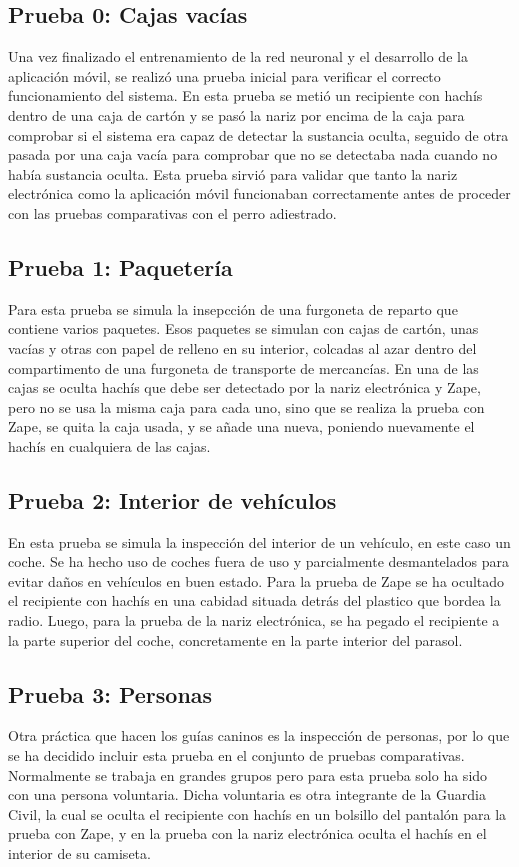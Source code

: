 \subsection{Prueba 0: Cajas vacías}
Una vez finalizado el entrenamiento de la red neuronal y el desarrollo de la aplicación móvil, se realizó una prueba inicial para verificar el correcto funcionamiento del sistema. En esta prueba se metió un recipiente con hachís dentro de una caja de cartón y se pasó la nariz por encima de la caja para comprobar si el sistema era capaz de detectar la sustancia oculta, seguido de otra pasada por una caja vacía para comprobar que no se detectaba nada cuando no había sustancia oculta. Esta prueba sirvió para validar que tanto la nariz electrónica como la aplicación móvil funcionaban correctamente antes de proceder con las pruebas comparativas con el perro adiestrado.

\subsection{Prueba 1: Paquetería}
Para esta prueba se simula la insepcción de una furgoneta de reparto que contiene varios paquetes. Esos paquetes se simulan con cajas de cartón, unas vacías y otras con papel de relleno en su interior, colcadas al azar dentro del compartimento de una furgoneta de transporte de mercancías. En una de las cajas se oculta hachís que debe ser detectado por la nariz electrónica y Zape, pero no se usa la misma caja para cada uno, sino que se realiza la prueba con Zape, se quita la caja usada, y se añade una nueva, poniendo nuevamente el hachís en cualquiera de las cajas.

\subsection{Prueba 2: Interior de vehículos}
En esta prueba se simula la inspección del interior de un vehículo, en este caso un coche. Se ha hecho uso de coches fuera de uso y parcialmente desmantelados para evitar daños en vehículos en buen estado. Para la prueba de Zape se ha ocultado el recipiente con hachís en una cabidad situada detrás del plastico que bordea la radio. Luego, para la prueba de la nariz electrónica, se ha pegado el recipiente a la parte superior del coche, concretamente en la parte interior del parasol.

\subsection{Prueba 3: Personas}
Otra práctica que hacen los guías caninos es la inspección de personas, por lo que se ha decidido incluir esta prueba en el conjunto de pruebas comparativas. Normalmente se trabaja en grandes grupos pero para esta prueba solo ha sido con una persona voluntaria. Dicha voluntaria es otra integrante de la Guardia Civil, la cual se oculta el recipiente con hachís en un bolsillo del pantalón para la prueba con Zape, y en la prueba con la nariz electrónica oculta el hachís en el interior de su camiseta.

